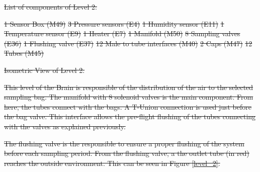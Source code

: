 \documentclass[a4paper,12pt,twoside]{article}
\providecommand{\DIFdeltex}[1]{{\protect\color{red}\sout{#1}}}                      %
\providecommand{\DIFdelFL}[1]{\DIFdel{#1}} %
\providecommand{\DIFdel}[1]{\texorpdfstring{\DIFdeltex{#1}}{}} %
\begin{document}
\DIFdel{List of components of Level 2:
}%

\DIFdel{1 Sensor Box (M49)
    }%
\DIFdel{3 Pressure sensors (E4)
    }%
\DIFdel{1 Humidity sensor (E11)
    }%
\DIFdel{1 Temperature sensor (E9)
    }%
\DIFdel{1 Heater (E7)
    }%
\DIFdel{1 Manifold (M50)
    }%
\DIFdel{8 Sampling valves (E36)
    }%
\DIFdel{1 Flushing valve (E37)
    }%
\DIFdel{12 Male to tube interfaces (M40)
    }%
\DIFdel{2 Caps (M47)
    }%
\DIFdel{12 Tubes (M45)
}%

{%
\DIFdelFL{Isometric View of Level 2.}}

\DIFdel{This level of the Brain is responsible of the distribution of the air to the selected sampling bag. The manifold with 8 solenoid valves is the main component. From here, the tubes connect with the bags. A T-Union connection is used just before the bag valve. This interface allows the pre-flight flushing of the tubes connecting with the valves as explained previously. 
}%

\DIFdel{The flushing valve is the responsible to ensure a proper flushing of the system before each sampling period. From the flushing valve, a the outlet tube (in red) reaches the outside environment. This can be seen in Figure \ref{level_2}.
}%
\end{document}
